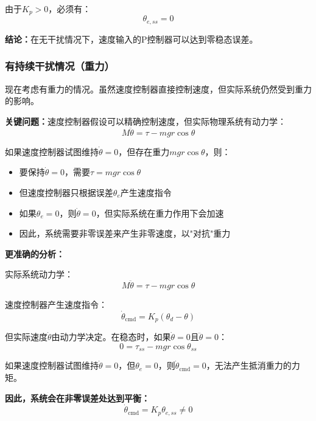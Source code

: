 \documentclass[12pt,a4paper]{article}
\begin{document}
由于$K_p > 0$，必须有：
\begin{equation}
\theta_{e,ss} = 0
\end{equation}

\textbf{结论：}在无干扰情况下，速度输入的P控制器可以达到零稳态误差。

\subsubsection{有持续干扰情况（重力）}

现在考虑有重力的情况。虽然速度控制器直接控制速度，但实际系统仍然受到重力的影响。

\textbf{关键问题：}速度控制器假设可以精确控制速度，但实际物理系统有动力学：
\begin{equation}
M\ddot{\theta} = \tau - mgr\cos\theta
\end{equation}

如果速度控制器试图维持$\dot{\theta} = 0$，但存在重力$mgr\cos\theta$，则：
\begin{itemize}
\item 要保持$\dot{\theta} = 0$，需要$\tau = mgr\cos\theta$
\item 但速度控制器只根据误差$\theta_e$产生速度指令
\item 如果$\theta_e = 0$，则$\dot{\theta} = 0$，但实际系统在重力作用下会加速
\item 因此，系统需要非零误差来产生非零速度，以"对抗"重力
\end{itemize}

\textbf{更准确的分析：}

实际系统动力学：
\begin{equation}
M\ddot{\theta} = \tau - mgr\cos\theta
\end{equation}

速度控制器产生速度指令：
\begin{equation}
\dot{\theta}_{\text{cmd}} = K_p(\theta_d - \theta)
\end{equation}

但实际速度$\dot{\theta}$由动力学决定。在稳态时，如果$\dot{\theta} = 0$且$\ddot{\theta} = 0$：
\begin{equation}
0 = \tau_{ss} - mgr\cos\theta_{ss}
\end{equation}

如果速度控制器试图维持$\dot{\theta} = 0$，但$\theta_e = 0$，则$\dot{\theta}_{\text{cmd}} = 0$，无法产生抵消重力的力矩。

\textbf{因此，系统会在非零误差处达到平衡：}
\begin{equation}
\dot{\theta}_{\text{cmd}} = K_p \theta_{e,ss} \neq 0
\end{equation}
\end{document}
